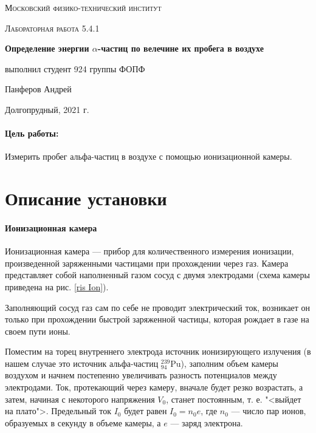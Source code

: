 \documentclass[a4paper, 12pt]{article}
\begin{document}
	
\begin{titlepage}
	\centering
	\vspace{5cm}
	{\scshape\LARGE Московский физико-технический институт \par}
	\vspace{4cm}
	{\scshape\Large Лабораторная работа 5.4.1 \par}
	\vspace{1cm}
	{\huge\bfseries Определение энергии $\alpha$-частиц по велечине их пробега в воздухе\par}
	\vspace{1cm}
	\vfill
\begin{flushright}
	{\large выполнил студент 924 группы ФОПФ}\par
	\vspace{0.3cm}
	{\LARGE Панферов Андрей}
\end{flushright}
	

	\vfill

	Долгопрудный, 2021 г.
\end{titlepage}

\paragraph*{Цель работы:} Измерить пробег альфа-частиц в воздухе с помощью ионизационной камеры.
\section*{Описание установки}
\paragraph*{Ионизационная камера}
	
	Ионизационная камера --- прибор для количественного измерения
	ионизации, произведенной заряженными частицами при прохождении
	через газ. Камера представляет собой наполненный газом сосуд с двумя электродами (схема камеры приведена на рис. \ref{ris Ion}). 
	
	Заполняющий сосуд газ сам по себе не проводит электрический ток, возникает он только при прохождении быстрой заряженной частицы, которая рождает в газе на своем пути ионы.
	
	Поместим на торец внутреннего электрода источник
	ионизирующего излучения (в нашем случае это источник
	альфа-частиц $ ^{239}_{94} $Pu), заполним объем камеры воздухом и начнем
	постепенно увеличивать разность потенциалов между электродами. Ток, протекающий через камеру, вначале будет резко возрастать, а затем, начиная с некоторого напряжения $ V_0 $, станет постоянным, т. е. "<выйдет на плато">.  Предельный ток $ I_0 $ будет равен $ I_0 = n_0e $,
	где $ n_0 $ --- число пар ионов, образуемых в секунду в объеме камеры, а $ e $ --- заряд электрона.
	
\end{document}
